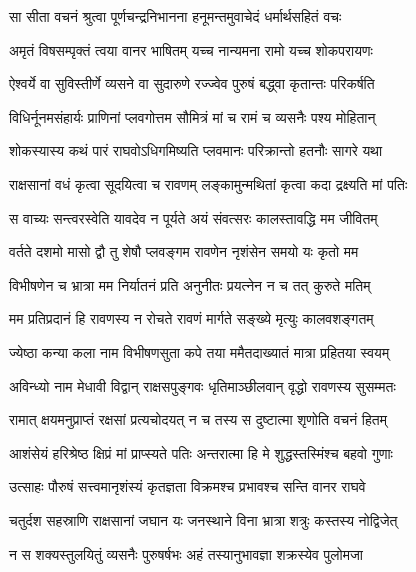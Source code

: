 
\twolineshloka
{सा सीता वचनं श्रुत्वा पूर्णचन्द्रनिभानना}
{हनूमन्तमुवाचेदं धर्मार्थसहितं वचः} %

\twolineshloka
{अमृतं विषसम्पृक्तं त्वया वानर भाषितम्}
{यच्च नान्यमना रामो यच्च शोकपरायणः} %

\twolineshloka
{ऐश्वर्ये वा सुविस्तीर्णे व्यसने वा सुदारुणे}
{रज्ज्वेव पुरुषं बद्ध्वा कृतान्तः परिकर्षति} %

\twolineshloka
{विधिर्नूनमसंहार्यः प्राणिनां प्लवगोत्तम}
{सौमित्रं मां च रामं च व्यसनैः पश्य मोहितान्} %

\twolineshloka
{शोकस्यास्य कथं पारं राघवोऽधिगमिष्यति}
{प्लवमानः परिक्रान्तो हतनौः सागरे यथा} %

\twolineshloka
{राक्षसानां वधं कृत्वा सूदयित्वा च रावणम्}
{लङ्कामुन्मथितां कृत्वा कदा द्रक्ष्यति मां पतिः} %

\twolineshloka
{स वाच्यः सन्त्वरस्वेति यावदेव न पूर्यते}
{अयं संवत्सरः कालस्तावद्धि मम जीवितम्} %

\twolineshloka
{वर्तते दशमो मासो द्वौ तु शेषौ प्लवङ्गम}
{रावणेन नृशंसेन समयो यः कृतो मम} %

\twolineshloka
{विभीषणेन च भ्रात्रा मम निर्यातनं प्रति}
{अनुनीतः प्रयत्नेन न च तत् कुरुते मतिम्} %

\twolineshloka
{मम प्रतिप्रदानं हि रावणस्य न रोचते}
{रावणं मार्गते सङ्ख्ये मृत्युः कालवशङ्गतम्} %

\twolineshloka
{ज्येष्ठा कन्या कला नाम विभीषणसुता कपे}
{तया ममैतदाख्यातं मात्रा प्रहितया स्वयम्} %

\twolineshloka
{अविन्ध्यो नाम मेधावी विद्वान् राक्षसपुङ्गवः}
{धृतिमाञ्छीलवान् वृद्धो रावणस्य सुसम्मतः} %

\twolineshloka
{रामात् क्षयमनुप्राप्तं रक्षसां प्रत्यचोदयत्}
{न च तस्य स दुष्टात्मा शृणोति वचनं हितम्} %

\twolineshloka
{आशंसेयं हरिश्रेष्ठ क्षिप्रं मां प्राप्स्यते पतिः}
{अन्तरात्मा हि मे शुद्धस्तस्मिंश्च बहवो गुणाः} %

\twolineshloka
{उत्साहः पौरुषं सत्त्वमानृशंस्यं कृतज्ञता}
{विक्रमश्च प्रभावश्च सन्ति वानर राघवे} %

\twolineshloka
{चतुर्दश सहस्राणि राक्षसानां जघान यः}
{जनस्थाने विना भ्रात्रा शत्रुः कस्तस्य नोद्विजेत्} %

\twolineshloka
{न स शक्यस्तुलयितुं व्यसनैः पुरुषर्षभः}
{अहं तस्यानुभावज्ञा शक्रस्येव पुलोमजा} %

